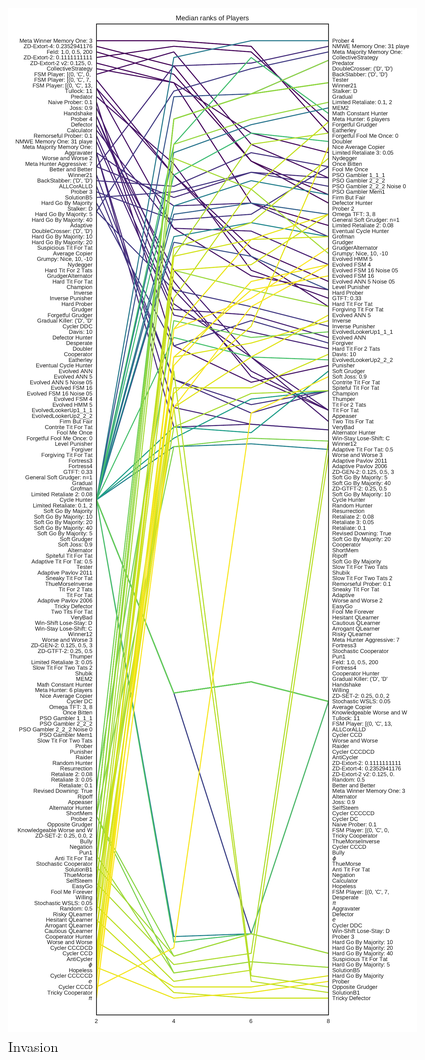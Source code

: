 \documentclass{article}
\begin{document}
\begin{figure}[!hbtp]
    \centering
    \includegraphics[height=.9\textheight]{../img/median_rank_vs_population_size_invasion.pdf}
    \caption{Invasion}
    \label{fig:ranks_v_size_invasion}
\end{figure}
\end{document}

